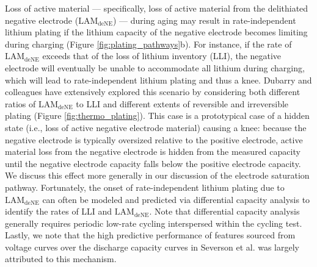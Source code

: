 \documentclass[journal=jpclcd,manuscript=article]{achemso}
\begin{document}
Loss of active material --- specifically, loss of active material from the delithiated negative electrode ($\mathrm{LAM_{deNE}}$) --- during aging may result in rate-independent lithium plating if the lithium capacity of the negative electrode becomes limiting during charging (Figure \ref{fig:plating_pathways}b). For instance, if the rate of $\mathrm{LAM_{deNE}}$ exceeds that of the loss of lithium inventory (LLI), the negative electrode will eventually be unable to accommodate all lithium during charging, which will lead to rate-independent lithium plating and thus a knee. Dubarry and colleagues\cite{ansean_operando_2017, dubarry_durability_2018, baure_synthetic_2019, dubarry_big_2020} have extensively explored this scenario by considering both different ratios of $\mathrm{LAM_{deNE}}$ to LLI and different extents of reversible and irreversible plating (Figure \ref{fig:thermo_plating}). This case is a prototypical case of a hidden state (i.e., loss of active negative electrode material) causing a knee: because the negative electrode is typically oversized relative to the positive electrode, active material loss from the negative electrode is hidden from the measured capacity until the negative electrode capacity falls below the positive electrode capacity. We discuss this effect more generally in our discussion of the electrode saturation pathway. Fortunately, the onset of rate-independent lithium plating due to $\mathrm{LAM_{deNE}}$ can often be modeled and predicted via differential capacity analysis\cite{ansean_operando_2017, dubarry_durability_2018, baure_synthetic_2019, dubarry_big_2020} to identify the rates of LLI and $\mathrm{LAM_{deNE}}$. Note that differential capacity analysis generally requires periodic low-rate cycling interspersed within the cycling test.
Lastly, we note that the high predictive performance of features sourced from voltage curves over the discharge capacity curves in Severson et al.\cite{severson_data-driven_2019} was largely attributed to this mechanism.
\end{document}
